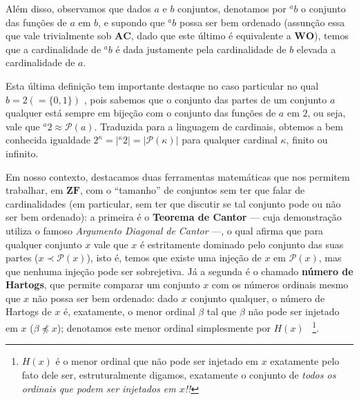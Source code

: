 \documentclass{hipatia}
\newcommand{\partes}[1]{\mathcal{P}(#1)}
\newcommand{\preccurlyneq}{\prec}
\newcommand{\wo}{\mathbf{WO}}
\newcommand{\ac}{\mathbf{AC}}
\newcommand{\zf}{\mathbf{ZF}}
\begin{document}
Além disso, observamos que dados $a$ e $b$ conjuntos,
denotamos por $^ab$ o conjunto das funções de $a$ em $b$, e
supondo que $^a b$ possa ser bem ordenado (assunção essa que
vale trivialmente sob $\ac$, dado que este último é
equivalente a $\wo$), temos que a cardinalidade de $^ab$ é
dada justamente pela cardinalidade de $b$ elevada a
cardinalidade de $a$.

Esta última definição tem importante destaque no caso
particular no qual     $b=2 (=\{0,1\})$
, pois sabemos que o conjunto
das partes de um conjunto $a$ qualquer está sempre em bijeção com o
conjunto das funções de $a$ em $2$, ou seja, vale que
$^a2\approx\partes{a}$. Traduzida para a linguagem de
cardinais, obtemos a bem conhecida igualdade $2^\kappa =
|^\kappa 2| = |\partes{\kappa}|$ para qualquer cardinal
$\kappa$, finito ou infinito. 

\sepdecorada


Em nosso contexto, destacamos duas ferramentas matemáticas que
nos permitem trabalhar, em $\zf$, com o ``tamanho'' de
conjuntos sem ter que falar de cardinalidades (em particular, sem
ter que discutir se tal conjunto pode ou não ser bem
ordenado): a primeira é o \textbf{Teorema de Cantor} ---
cuja demonstração utiliza o famoso {\it Argumento Diagonal
de Cantor} ---, o qual afirma que para qualquer conjunto $x$
vale que $x$ é estritamente dominado pelo conjunto das suas
partes ($x\preccurlyneq\partes{x}$), isto é, temos que
existe uma injeção de $x$ em $\partes{x}$, mas que nenhuma
injeção pode ser sobrejetiva. Já a segunda é o chamado
\textbf{número de Hartogs}, que permite comparar um conjunto
$x$ com os números ordinais mesmo que $x$ não possa ser bem
ordenado: dado $x$ conjunto qualquer,  o número de Hartogs
de $x$ é, exatamente, o menor ordinal $\beta$ tal que
$\beta$ não pode ser injetado em $x$ ($\beta\npreccurlyeq
x$); denotamos este menor ordinal simplesmente por
$H(x)$ ~\footnote{$H(x)$ é o menor ordinal que não pode ser
injetado em $x$ exatamente pelo fato dele ser,
estruturalmente digamos, exatamente o conjunto de {\it todos
os ordinais que podem ser injetados em $x$!!}}.
\end{document}
